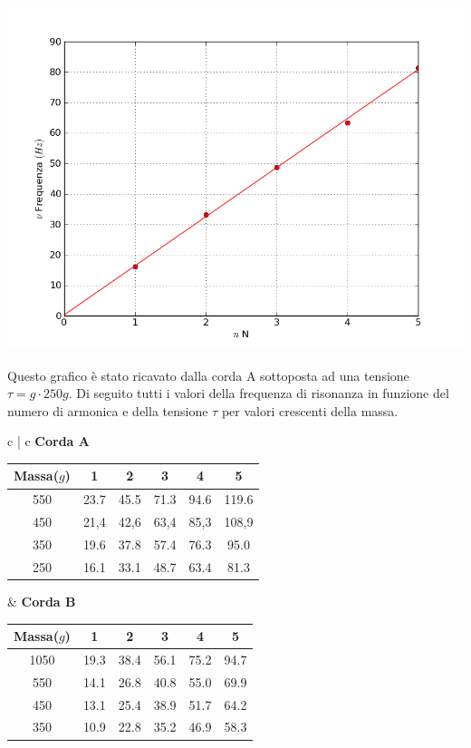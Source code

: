 \begin{center}

\includegraphics[scale=0.5]{../grafici/corda_1armonica}
\end{center}
Questo grafico è stato ricavato dalla corda A sottoposta ad una tensione $\tau=g\cdot250g$. Di seguito tutti i valori della frequenza di risonanza in funzione del numero di armonica e della tensione $\tau$ per valori crescenti della massa.

\begin{center}
\begin{tabular}{c   |  c}
\textbf{Corda A }
\begin{tabular}{ c | c | c | c | c | c }
Massa($g$) & 1 & 2 & 3 & 4 & 5\\
\midrule
550 & 23.7 & 45.5 & 71.3 & 94.6 & 119.6\\
450 & 21,4 & 42,6 & 63,4 & 85,3 & 108,9\\
350 & 19.6 & 37.8 & 57.4 & 76.3 & 95.0\\
250 & 16.1 & 33.1 & 48.7 & 63.4 & 81.3 \\
\end{tabular}
&
\textbf{Corda B}
\begin{tabular}{ c | c | c | c | c | c }
Massa($g$) & 1 & 2 & 3 & 4 & 5\\
\midrule
1050 & 19.3 & 38.4 & 56.1 & 75.2 & 94.7 \\
550 & 14.1 & 26.8 & 40.8 & 55.0 & 69.9 \\
450 & 13.1 & 25.4 & 38.9 & 51.7 & 64.2\\
350 & 10.9 & 22.8 & 35.2 & 46.9 & 58.3\\
\end{tabular}

\end{tabular}
\end{center}
